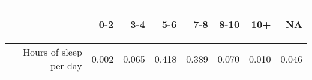 \documentclass{article}\usepackage[]{graphicx}\usepackage[]{color}
\begin{document}
\begin{table}[ht]
\centering
\begin{tabular}{rrrrrrrr}
  \hline
 & \begin{sideways} 0-2 \end{sideways} & \begin{sideways} 3-4 \end{sideways} & \begin{sideways} 5-6 \end{sideways} & \begin{sideways} 7-8 \end{sideways} & \begin{sideways} 8-10 \end{sideways} & \begin{sideways} 10+ \end{sideways} & \begin{sideways} NA \end{sideways} \\ 
  \hline
Hours of sleep per day & 0.002 & 0.065 & 0.418 & 0.389 & 0.070 & 0.010 & 0.046 \\ 
   \hline
\end{tabular}
\end{table}


\newpage
\end{document}
